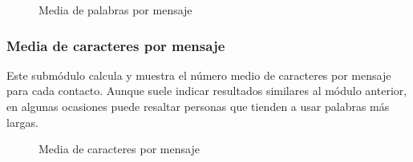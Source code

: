 \begin{figure}[H]
	\centering
	\qquad
	\caption{Media de palabras por mensaje}
	\label{fig:chap4:word_avg}
\end{figure}

\subsubsection{Media de caracteres por mensaje}

Este submódulo calcula y muestra el número medio de caracteres por mensaje para cada contacto. Aunque suele indicar resultados similares al módulo anterior, en algunas ocasiones puede resaltar personas que tienden a usar palabras más largas.

\begin{figure}[H]
	\centering
	\qquad
	\caption{Media de caracteres por mensaje}
	\label{fig:chap4:char_avg}
\end{figure}

